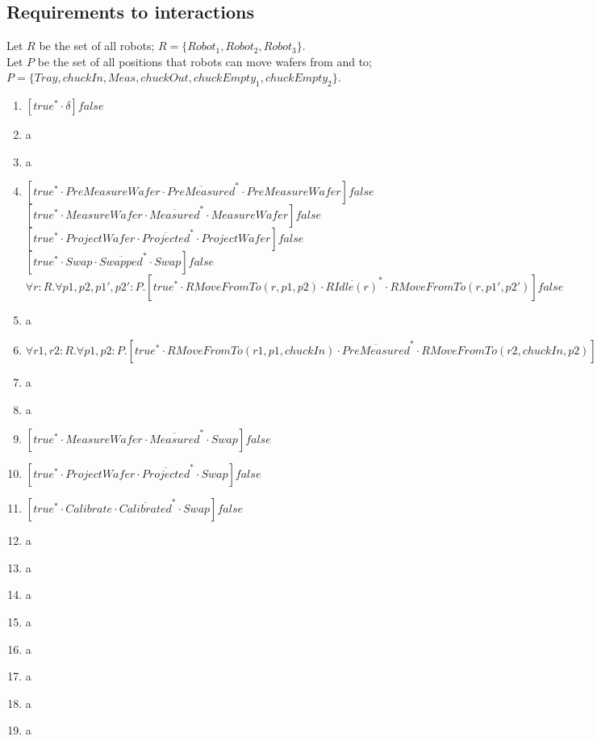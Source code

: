 \subsection{Requirements to interactions}
Let $R$ be the set of all robots; $R = \{Robot_1, Robot_2, Robot_3\}$.\\
Let $P$ be the set of all positions that robots can move wafers from and to; $P = \{Tray, chuckIn, Meas, chuckOut, chuckEmpty_1, chuckEmpty_2\}$.
\begin{enumerate}
    \item $[true^{*}\cdot \delta]false$
    \item a
    \item a
    \item 
	    $[true^{*}\cdot PreMeasureWafer \cdot \overline{PreMeasured}^{*} \cdot PreMeasureWafer]false$\\
	    $[true^{*}\cdot MeasureWafer \cdot \overline{Measured}^{*} \cdot MeasureWafer]false$\\
	    $[true^{*}\cdot ProjectWafer \cdot \overline{Projected}^{*} \cdot ProjectWafer]false$\\
	    $[true^{*}\cdot Swap \cdot \overline{Swapped}^{*} \cdot Swap]false$\\
	    $\forall r:R.\forall p1,p2,p1',p2':P.[true^{*}\cdot RMoveFromTo(r, p1, p2) \cdot \overline{RIdle(r)}^{*} \cdot RMoveFromTo(r, p1', p2')]false$\\
    \item a
    \item $\forall r1,r2:R.\forall p1,p2:P.[true^{*}\cdot RMoveFromTo(r1, p1, chuckIn) \cdot \overline{PreMeasured}^{*} \cdot RMoveFromTo(r2, chuckIn, p2)]false$
    \item a
    \item a
    \item $[true^{*}\cdot MeasureWafer\cdot \overline{Measured}^{*}\cdot Swap]false$
    \item $[true^{*}\cdot ProjectWafer\cdot \overline{Projected}^{*}\cdot Swap]false$
    \item $[true^{*}\cdot Calibrate\cdot \overline{Calibrated}^{*}\cdot Swap]false$
    \item a
    \item a
    \item a
    \item a
    \item a
    \item a
    \item a
    \item a
\end{enumerate}